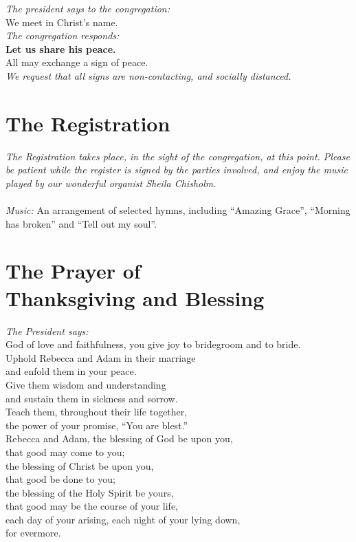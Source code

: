 \documentclass[a4paper,12pt,titlepage]{article}
\begin{document}
{\em The president says to the congregation:}\\
We meet in Christ's name.\\

{\em The congregation responds:}\\
{\bf Let us share his peace.}\\

All may exchange a sign of peace.\\

{\em We request that all signs are non-contacting, and socially distanced.}

\section{The Registration} 

{\em The Registration takes place, in the sight of the congregation, at this point. Please be patient while the register is signed by the parties involved, and enjoy the music played by our wonderful organist Sheila Chisholm.}\\
\\
{\em Music:} An arrangement of selected hymns, including ``Amazing Grace'', ``Morning has broken'' and ``Tell out my soul''.

\clearpage
\section{The Prayer of \\Thanksgiving and Blessing}

{\em The President says:}\\
God of love and faithfulness, you give joy to bridegroom and to bride.\\
Uphold Rebecca and Adam in their marriage\\
and enfold them in your peace.\\
Give them wisdom and understanding\\
and sustain them in sickness and sorrow.\\
Teach them, throughout their life together,\\
the power of your promise, “You are blest.”\\


Rebecca and Adam, the blessing of God be upon you,\\
that good may come to you;\\
the blessing of Christ be upon you,\\
that good be done to you;\\
the blessing of the Holy Spirit be yours,\\
that good may be the course of your life,\\
each day of your arising, each night of your lying down,\\
for evermore.\\
\end{document}
